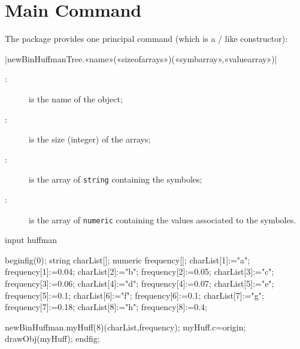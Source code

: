 \documentclass[english]{ltxdoc}
\begin{document}
\section{Main Command}

The package \huffman provides one principal command (which is a \MO/ like
constructor):

\commande|newBinHuffmanTree.«name»(«sizeofarrays»)(«symbarray»,«valuearray»)|\smallskip{}


\begin{description}
  \item[:] is the name of the object;
  \item[:] is the size (integer) of the arrays;
  \item[:] is the array of \lstinline+string+ containing the
  symboles;
  \item[:] is the array of \lstinline+numeric+ containing the
  values associated to the symboles.
\end{description}



\begin{ExempleMP}
input huffman

beginfig(0);
string charList[];
numeric frequency[];
charList[1]:="a"; frequency[1]:=0.04;
charList[2]:="b"; frequency[2]:=0.05;
charList[3]:="c"; frequency[3]:=0.06;
charList[4]:="d"; frequency[4]:=0.07;
charList[5]:="e"; frequency[5]:=0.1;
charList[6]:="f"; frequency[6]:=0.1;
charList[7]:="g"; frequency[7]:=0.18;
charList[8]:="h"; frequency[8]:=0.4;

newBinHuffman.myHuff(8)(charList,frequency);
myHuff.c=origin;
drawObj(myHuff);
endfig;
\end{ExempleMP}

\printbibliography
\printindex
\end{document}
